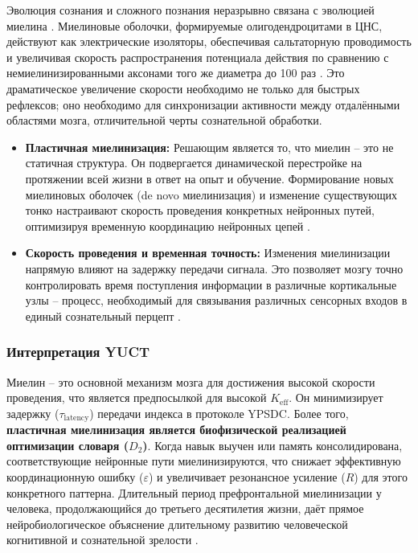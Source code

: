\documentclass[12pt,a4paper]{article}
\begin{document}
	Эволюция сознания и сложного познания неразрывно связана с эволюцией миелина \cite{Fields2008}. Миелиновые оболочки, формируемые олигодендроцитами в ЦНС, действуют как электрические изоляторы, обеспечивая сальтаторную проводимость и увеличивая скорость распространения потенциала действия по сравнению с немиелинизированными аксонами того же диаметра до 100 раз \cite{Waxman1980}. Это драматическое увеличение скорости необходимо не только для быстрых рефлексов; оно необходимо для синхронизации активности между отдалёнными областями мозга, отличительной черты сознательной обработки.
	
	\begin{itemize}
		\item \textbf{Пластичная миелинизация:} Решающим является то, что миелин – это не статичная структура. Он подвергается динамической перестройке на протяжении всей жизни в ответ на опыт и обучение. Формирование новых миелиновых оболочек (de novo миелинизация) и изменение существующих тонко настраивают скорость проведения конкретных нейронных путей, оптимизируя временную координацию нейронных цепей \cite{deFaria2021, Monje2023}.
		\item \textbf{Скорость проведения и временная точность:} Изменения миелинизации напрямую влияют на задержку передачи сигнала. Это позволяет мозгу точно контролировать время поступления информации в различные кортикальные узлы – процесс, необходимый для связывания различных сенсорных входов в единый сознательный перцепт \cite{Pajevic2014}.
	\end{itemize}
	
	\subsubsection*{Интерпретация YUCT}
	Миелин – это основной механизм мозга для достижения высокой скорости проведения, что является предпосылкой для высокой \(K_{\mathrm{eff}}\). Он минимизирует задержку (\(\tau_{\text{latency}}\)) передачи индекса в протоколе YPSDC. Более того, \textbf{пластичная миелинизация является биофизической реализацией оптимизации словаря (\(D_2\))}. Когда навык выучен или память консолидирована, соответствующие нейронные пути миелинизируются, что снижает эффективную координационную ошибку (\(\varepsilon\)) и увеличивает резонансное усиление (\(R\)) для этого конкретного паттерна. Длительный период префронтальной миелинизации у человека, продолжающийся до третьего десятилетия жизни, даёт прямое нейробиологическое объяснение длительному развитию человеческой когнитивной и сознательной зрелости \cite{Miller2012, Fields2015}.
	
\end{document}
